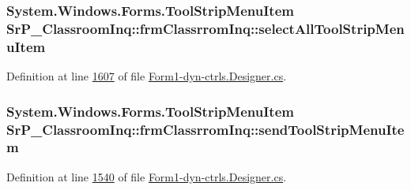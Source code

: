 \hypertarget{class_sr_p___classroom_inq_1_1frm_classrrom_inq_a7e6e1b306acf890605ad11f6aca7fce7}{
\subsubsection[{select\-All\-Tool\-Strip\-Menu\-Item}]{\setlength{\rightskip}{0pt plus 5cm}\-System.\-Windows.\-Forms.\-Tool\-Strip\-Menu\-Item {\bf \-Sr\-P\-\_\-\-Classroom\-Inq\-::frm\-Classrrom\-Inq\-::select\-All\-Tool\-Strip\-Menu\-Item}}}
\label{class_sr_p___classroom_inq_1_1frm_classrrom_inq_a7e6e1b306acf890605ad11f6aca7fce7}


\-Definition at line \hyperlink{_form1-dyn-ctrls_8_designer_8cs_source_l01607}{1607} of file \hyperlink{_form1-dyn-ctrls_8_designer_8cs_source}{\-Form1-\/dyn-\/ctrls.\-Designer.\-cs}.

\hypertarget{class_sr_p___classroom_inq_1_1frm_classrrom_inq_ab491a97cbd395fd4e69e4312fdc48eeb}{
\subsubsection[{send\-Tool\-Strip\-Menu\-Item}]{\setlength{\rightskip}{0pt plus 5cm}\-System.\-Windows.\-Forms.\-Tool\-Strip\-Menu\-Item {\bf \-Sr\-P\-\_\-\-Classroom\-Inq\-::frm\-Classrrom\-Inq\-::send\-Tool\-Strip\-Menu\-Item}}}
\label{class_sr_p___classroom_inq_1_1frm_classrrom_inq_ab491a97cbd395fd4e69e4312fdc48eeb}


\-Definition at line \hyperlink{_form1-dyn-ctrls_8_designer_8cs_source_l01540}{1540} of file \hyperlink{_form1-dyn-ctrls_8_designer_8cs_source}{\-Form1-\/dyn-\/ctrls.\-Designer.\-cs}.

